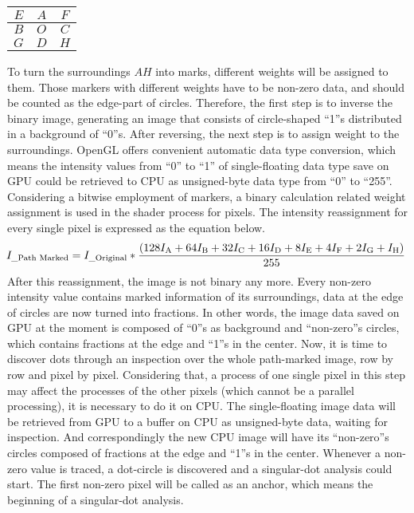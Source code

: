 \begin{center}
  \begin{tabular}{ | c | c | c | }
    \hline
    \(E\) & \(A\) & \(F\) \\ \hline
    \(B\) & \(O\) & \(C\) \\ \hline
    \(G\) & \(D\) & \(H\) \\
    \hline
  \end{tabular}
\end{center}
%
To turn the surroundings \(A\)\texttildelow \(H\) into marks, different weights will be assigned to them. Those markers with different weights have to be non-zero data, and should be counted as the edge-part of circles. Therefore, the first step is to inverse the binary image, generating an image that consists of circle-shaped \enquote{1}s distributed in a background of \enquote{0}s.%
%
After reversing, the next step is to assign weight to the surroundings. OpenGL offers convenient automatic data type conversion, which means the intensity values from \enquote{0} to \enquote{1} of single-floating data type save on GPU could be retrieved to CPU as unsigned-byte data type from \enquote{0} to \enquote{255}. Considering a bitwise employment of markers, a binary calculation related weight assignment is used in the shader process for pixels. The intensity reassignment for every single pixel is expressed as the equation below.
%
\begin{equation}
\hspace*{-0.1cm}%
%
I_{\text{\_Path Marked}} = I_{\text{\_Original}} * \frac{(128I_{\text{A}} + 64I_{\text{B}} + 32I_{\text{C}} + 16I_{\text{D}} + 8I_{\text{E}} +  4I_{\text{F}} +  2I_{\text{G}}+I_{\text{H}})}{ 255 }
%
\label{snifferDistributionWeight}
\end{equation}%
\indent%
After this reassignment, the image is not binary any more. Every non-zero intensity value contains marked information of its surroundings, data at the edge of circles are now turned into fractions. In other words, the image data saved on GPU at the moment is composed of \enquote{0}s as background and \enquote{non-zero}s circles, which contains fractions at the edge and \enquote{1}s in the center.%
%
Now, it is time to discover dots through an inspection over the whole path-marked image, row by row and pixel by pixel. Considering that, a process of one single pixel in this step may affect the processes of the other pixels (which cannot be a parallel processing), it is necessary to do it on CPU. The single-floating image data will be retrieved from GPU to a buffer on CPU as unsigned-byte data, waiting for inspection. And correspondingly the new CPU image will have its \enquote{non-zero}s circles composed of fractions at the edge and \enquote{1}s in the center. Whenever a non-zero value is traced, a dot-circle is discovered and a singular-dot analysis could start. The first non-zero pixel will be called as an anchor, which means the beginning of a singular-dot analysis. %
